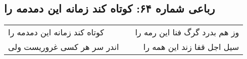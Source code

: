 \begin{center}
\section*{رباعی شماره ۶۴: کوتاه کند زمانه این دمدمه را}
\label{sec:0064}
\begin{longtable}{l p{0.5cm} r}
کوتاه کند زمانه این دمدمه را
&&
وز هم بدرد گرگ فنا این رمه را
\\
اندر سر هر کسی غروریست ولی
&&
سیل اجل قفا زند این همه را
\\
\end{longtable}
\end{center}
